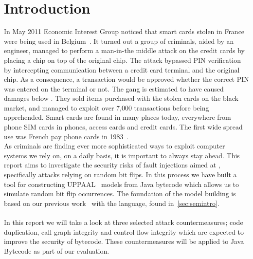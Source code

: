 \chapter{Introduction}
In May 2011 Economic Interest Group noticed that smart cards stolen in France were being used in Belgium~\cite{fun}. It turned out a group of criminals, aided by an engineer, managed to perform a man-in-the middle attack on the credit cards by placing a chip on top of the original chip. The attack bypassed PIN verification by intercepting communication between a credit card terminal and the original chip. As a consequence, a transaction would be approved whether the correct PIN was entered on the terminal or not. The gang is estimated to have caused damages below . They sold items purchased with the stolen cards on the black market, and managed to exploit over 7,000 transactions before being apprehended. Smart cards are found in many places today, everywhere from phone SIM cards in phones, access cards and credit cards. The first wide spread use was French pay phone cards in 1983~\cite[p. 366]{modbank}.\\

\noindent As criminals are finding ever more sophisticated ways to exploit computer systems we rely on, on a daily basis, it is important to always stay ahead.
This report aims to investigate the security risks of fault injections aimed at \jc, specifically attacks relying on random bit flips. 
In this process we have built a tool for constructing UPPAAL~\cite{upptut} models from Java bytecode which allows us to simulate random bit flip occurrences. 
The foundation of the model building is based on our previous work~\cite{javasec} with the \jcl language, found in~\cref{sec:semintro}.\\\\
In this report we will take a look at three selected attack countermeasures; code duplication, call graph integrity and control flow integrity which are expected to improve the security of \jc bytecode. 
These countermeasures will be applied to Java Bytecode as part of our evaluation.
